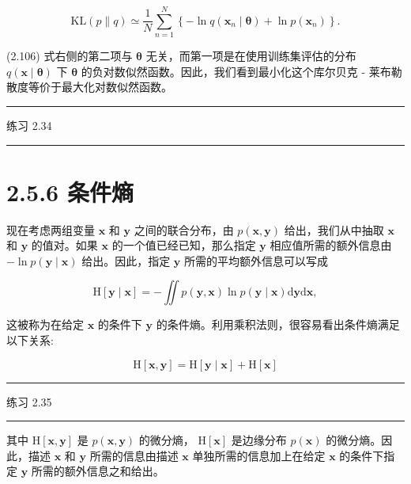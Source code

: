 \documentclass[10pt]{article}
\newcommand{\HRule}{\begin{center}\rule{0.9\linewidth}{0.2mm}\end{center}}
\begin{document}
\[
\mathrm{{KL}}\left( {p\parallel q}\right)  \simeq  \frac{1}{N}\mathop{\sum }\limits_{{n = 1}}^{N}\left\{  {-\ln q\left( {{\mathbf{x}}_{n} \mid  \mathbf{\theta }}\right)  + \ln p\left( {\mathbf{x}}_{n}\right) }\right\}  . \tag{2.106}
\]

(2.106) 式右侧的第二项与 \(\mathbf{\theta }\) 无关，而第一项是在使用训练集评估的分布 \(q\left( {\mathbf{x} \mid  \mathbf{\theta }}\right)\) 下 \(\mathbf{\theta }\) 的负对数似然函数。因此，我们看到最小化这个库尔贝克 - 莱布勒散度等价于最大化对数似然函数。

\HRule

练习 2.34

\HRule

\section*{2.5.6 条件熵}

现在考虑两组变量 \(\mathbf{x}\) 和 \(\mathbf{y}\) 之间的联合分布，由 \(p\left( {\mathbf{x},\mathbf{y}}\right)\) 给出，我们从中抽取 \(\mathbf{x}\) 和 \(\mathbf{y}\) 的值对。如果 \(\mathbf{x}\) 的一个值已经已知，那么指定 \(\mathbf{y}\) 相应值所需的额外信息由 \(- \ln p\left( {\mathbf{y} \mid  \mathbf{x}}\right)\) 给出。因此，指定 \(\mathbf{y}\) 所需的平均额外信息可以写成

\[
\mathrm{H}\left\lbrack  {\mathbf{y} \mid  \mathbf{x}}\right\rbrack   =  - \iint p\left( {\mathbf{y},\mathbf{x}}\right) \ln p\left( {\mathbf{y} \mid  \mathbf{x}}\right) \mathrm{d}\mathbf{y}\mathrm{d}\mathbf{x}, \tag{2.107}
\]

这被称为在给定 \(\mathbf{x}\) 的条件下 \(\mathbf{y}\) 的条件熵。利用乘积法则，很容易看出条件熵满足以下关系:

\[
\mathrm{H}\left\lbrack  {\mathbf{x},\mathbf{y}}\right\rbrack   = \mathrm{H}\left\lbrack  {\mathbf{y} \mid  \mathbf{x}}\right\rbrack   + \mathrm{H}\left\lbrack  \mathbf{x}\right\rbrack   \tag{2.108}
\]

\HRule

练习 2.35

\HRule

其中 \(\mathrm{H}\left\lbrack  {\mathbf{x},\mathbf{y}}\right\rbrack\) 是 \(p\left( {\mathbf{x},\mathbf{y}}\right)\) 的微分熵， \(\mathrm{H}\left\lbrack  \mathbf{x}\right\rbrack\) 是边缘分布 \(p\left( \mathbf{x}\right)\) 的微分熵。因此，描述 \(\mathbf{x}\) 和 \(\mathbf{y}\) 所需的信息由描述 \(\mathbf{x}\) 单独所需的信息加上在给定 \(\mathbf{x}\) 的条件下指定 \(\mathbf{y}\) 所需的额外信息之和给出。
\end{document}
